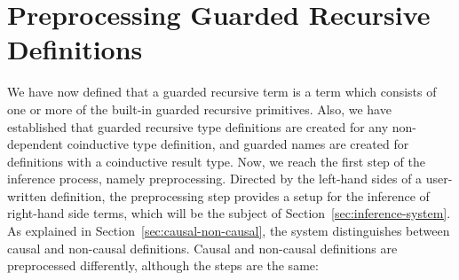




\section{Preprocessing Guarded Recursive Definitions}
\label{sec:impl-guard-recurs}
We have now defined that a guarded recursive term is a term which consists of one or
more of the built-in guarded recursive primitives. Also, we have established
that guarded recursive type definitions are created for any non-dependent
coinductive type definition, and guarded names are created for definitions with
a coinductive result type. Now, we reach the first step of the inference
process, namely preprocessing. Directed by the left-hand sides of a user-written
definition, the preprocessing step provides a setup for the inference of
right-hand side terms, which will be the subject of
Section~\ref{sec:inference-system}. As explained in Section~\ref{sec:causal-non-causal},
the system distinguishes between causal and non-causal definitions. Causal
and non-causal definitions are preprocessed differently, although the steps are
the same:


